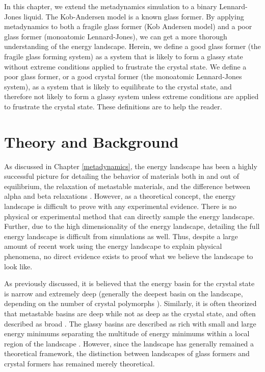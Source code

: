In this chapter, we extend the metadynamics simulation to a binary Lennard-Jones liquid.  The Kob-Andersen model is a known glass former.  By applying metadynamics to both a fragile glass former (Kob Andersen model) and a poor glass former (monoatomic Lennard-Jones), we can get a more thorough understanding of the energy landscape.  Herein, we define a good glass former (the fragile glass forming system) as a system that is likely to form a glassy state without extreme conditions applied to frustrate the crystal state.  We define a poor glass former, or a good crystal former (the monoatomic Lennard-Jones system), as a system that is likely to equilibrate to the crystal state, and therefore not likely to form a glassy system unless extreme conditions are applied to frustrate the crystal state.  These definitions are to help the reader.

\section{Theory and Background}
As discussed in Chapter \ref{metadynamics}, the energy landscape has been a highly successful picture for detailing the behavior of materials both in and out of equilibrium, the relaxation of metastable materials, and the difference between alpha and beta relaxations \cite{Royall2015}.  However, as a theoretical concept, the energy landscape is difficult to prove with any experimental evidence.  There is no physical or experimental method that can directly sample the energy landscape.  Further, due to the high dimensionality of the energy landscape, detailing the full energy landscape is difficult from simulations as well.  Thus, despite a large amount of recent work using the energy landscape to explain physical phenomena, no direct evidence exists to proof what we believe the landscape to look like.  

As previously discussed, it is believed that the energy basin for the crystal state is narrow and extremely deep (generally the deepest basin on the landscape, depending on the number of crystal polymorphs \cite{De2014}).  Similarly, it is often theorized that metastable basins are deep while not as deep as the crystal state, and often described as broad \cite{De2014}.  The glassy basins are described as rich with small and large energy minimums separating the multitude of energy minimums within a local region of the landscape \cite{De2014}.  However, since the landscape has generally remained a theoretical framework, the distinction between landscapes of glass formers and crystal formers has remained merely theoretical.  

